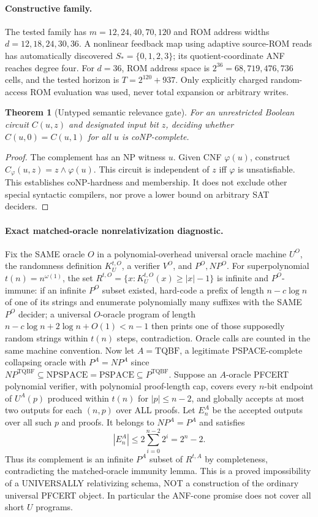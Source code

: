 \documentclass[11pt]{article}
\newtheorem{theorem}{Theorem}
\begin{document}
\paragraph{Constructive family.} The tested family has $m=12,24,40,70,120$ and ROM address widths $d=12,18,24,30,36$. A nonlinear feedback map using adaptive source-ROM reads has automatically discovered $S_*=\{0,1,2,3\}$; its quotient-coordinate ANF reaches degree four. For $d=36$, ROM address space is $2^{36}=68,719,476,736$ cells, and the tested horizon is $T=2^{120}+937$. Only explicitly charged random-access ROM evaluation was used, never total expansion or arbitrary writes.
\begin{theorem}[Untyped semantic relevance gate]
For an unrestricted Boolean circuit $C(u,z)$ and designated input bit $z$, deciding whether $C(u,0)=C(u,1)$ for all $u$ is coNP-complete.
\end{theorem}
\begin{proof}
The complement has an NP witness $u$. Given CNF $\varphi(u)$, construct $C_\varphi(u,z)=z\wedge\varphi(u)$. This circuit is independent of $z$ iff $\varphi$ is unsatisfiable. This establishes coNP-hardness and membership. It does not exclude other special syntactic compilers, nor prove a lower bound on arbitrary SAT deciders.
\end{proof}
\paragraph{Exact matched-oracle nonrelativization diagnostic.}
Fix the SAME oracle $O$ in a polynomial-overhead universal oracle machine $U^O$, the randomness definition $K_U^{t,O}$, a verifier $V^O$, and $P^O,NP^O$. For superpolynomial $t(n)=n^{\omega(1)}$, the set $R^{t,O}=\{x:K_U^{t,O}(x)\ge|x|-1\}$ is infinite and $P^O$-immune: if an infinite $P^O$ subset existed, hard-code a prefix of length $n-c\log n$ of one of its strings and enumerate polynomially many suffixes with the SAME $P^O$ decider; a universal $O$-oracle program of length $n-c\log n+2\log n+O(1)<n-1$ then prints one of those supposedly random strings within $t(n)$ steps, contradiction. Oracle calls are counted in the same machine convention.
Now let $A=\mathrm{TQBF}$, a legitimate PSPACE-complete collapsing oracle with $P^A=NP^A$ since $NP^{\mathrm{TQBF}}\subseteq\mathrm{NPSPACE}=\mathrm{PSPACE}\subseteq P^{\mathrm{TQBF}}$. Suppose an $A$-oracle PFCERT polynomial verifier, with polynomial proof-length cap, covers every $n$-bit endpoint of $U^A(p)$ produced within $t(n)$ for $|p|\le n-2$, and globally accepts at most two outputs for each $(n,p)$ over ALL proofs. Let $E^A_n$ be the accepted outputs over all such $p$ and proofs. It belongs to $NP^A=P^A$ and satisfies
\[
 |E^A_n|\le2\sum_{i=0}^{n-2}2^i=2^n-2.
\]
Thus its complement is an infinite $P^A$ subset of $R^{t,A}$ by completeness, contradicting the matched-oracle immunity lemma. This is a proved impossibility of a UNIVERSALLY relativizing schema, NOT a construction of the ordinary universal PFCERT object. In particular the ANF-cone promise does not cover all short $U$ programs.
\end{document}
